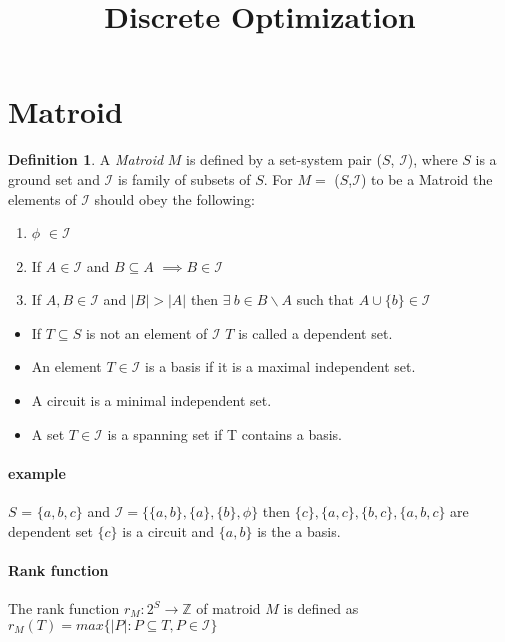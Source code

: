 \documentclass[options]{article}
\theoremstyle{definition}
\newtheorem{definition}{Definition}
\newcommand{\independentI}{\mathcal{I}}
\begin{document}
	\title{Discrete Optimization}
	\maketitle
\section{Matroid}
\begin{definition}
 A \emph{Matroid} $M$ is defined by a set-system pair ($S$,
$\mathcal{I}$), where $S$ is a ground set and $\mathcal{I}$ is family of subsets of $S$.
For $M =$ ($S$,$\mathcal{I}$) to be a Matroid the elements of $\mathcal{I}$
should obey the following:
\begin{enumerate}
\item $\phi$ $\in \mathcal{I}$
\item If $A \in \mathcal{I}$ and $B \subseteq A$ $\implies B \in \mathcal{I}$
\item If $A, B \in \mathcal{I}$ and $|B| > |A|$ then $ \exists \ b \in B \backslash  A$   such that $A \cup \{ b \} \in \mathcal{I}$ 
\end{enumerate}
\end{definition}

\begin{itemize}

\item If $ T \subseteq S$ is not an element of $\mathcal{I}$ $T$ is called a dependent set.
\item An element $T \in \mathcal{I}$ is a basis if it is a maximal independent set.
\item A circuit is a minimal independent set.
\item A set $T \in \mathcal{I}$  is a spanning set if T contains a basis. 
\end{itemize}
\paragraph{example} $S$ = $\{ a,b,c \}$ and $\independentI =\{ \{ a,b \},\{ a \}, \{ b \},\phi \}$ then $\{c \},\{a,c\},\{b,c\},\{a,b,c\}$ are dependent set  $\{c\}$ is a circuit and $\{ a,b\}$ is the a basis.
\paragraph{Rank function} The rank function $r_M : 2^S \rightarrow \mathbb{Z} $ of matroid $M$ is defined as $r_M (T) = max \{ |P|: P \subseteq T,P \in \independentI \}$
\end{document}
